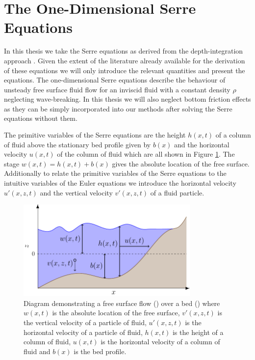 \section{The One-Dimensional Serre Equations}
In this thesis we take the Serre equations as derived from the depth-integration approach \cite{Su-Gardener-1969-536,Seabra-Santos-etal-1987-117}. Given the extent of the literature already available for the derivation of these equations we will only introduce the relevant quantities and present the equations. The one-dimensional Serre equations describe the behaviour of unsteady free surface fluid flow for an inviscid fluid with a constant density $\rho$ neglecting wave-breaking. In this thesis we will also neglect bottom friction effects as they can be simply incorporated into our methods after solving the Serre equations without them. 

The primitive variables of the Serre equations are the height $h(x,t)$ of a column of fluid above the stationary bed profile given by $b(x)$ and the horizontal velocity $u(x,t)$ of the column of fluid which are all shown in Figure \ref{fig:WaterModel}. The stage $w(x,t) = h(x,t) + b(x)$ gives the absolute location of the free surface. Additionally to relate the primitive variables of the Serre equations to the intuitive variables of the Euler equations we introduce the horizontal velocity $u'(x,z,t)$ and the vertical velocity $v'(x,z,t)$ of a fluid particle.

\begin{figure}
	\centering
	\includegraphics[width=0.8\textwidth]{./chp2/figures/SerreModel.pdf}
	\caption{Diagram demonstrating a free surface flow () over a bed () where $w(x,t)$ is the absolute location of the free surface, $v'(x,z,t)$ is the vertical velocity of a particle of fluid, $u'(x,z,t)$ is the horizontal velocity of a particle of fluid, $h(x,t)$ is the height of a column of fluid, $u(x,t)$ is the horizontal velocity of a column of fluid and $b(x)$ is the bed profile.}
	\label{fig:WaterModel}
\end{figure}

